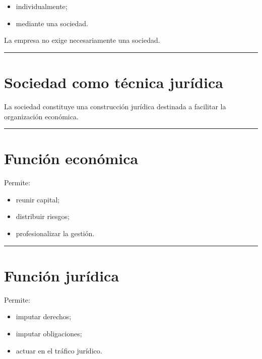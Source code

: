 \documentclass[
  spanish,
  letterpaper,
  DIV=11,
  numbers=noendperiod]{scrartcl}
\providecommand{\tightlist}{%
  \setlength{\itemsep}{0pt}\setlength{\parskip}{0pt}}
\begin{document}
\begin{itemize}
\tightlist
\item
  individualmente;
\item
  mediante una sociedad.
\end{itemize}

La empresa no exige necesariamente una sociedad.

\begin{center}\rule{0.5\linewidth}{0.5pt}\end{center}

\section{Sociedad como técnica
jurídica}\label{sociedad-como-tuxe9cnica-juruxeddica}

La sociedad constituye una construcción jurídica destinada a facilitar
la organización económica.

\begin{center}\rule{0.5\linewidth}{0.5pt}\end{center}

\section{Función económica}\label{funciuxf3n-econuxf3mica-1}

Permite:

\begin{itemize}
\tightlist
\item
  reunir capital;
\item
  distribuir riesgos;
\item
  profesionalizar la gestión.
\end{itemize}

\begin{center}\rule{0.5\linewidth}{0.5pt}\end{center}

\section{Función jurídica}\label{funciuxf3n-juruxeddica-1}

Permite:

\begin{itemize}
\tightlist
\item
  imputar derechos;
\item
  imputar obligaciones;
\item
  actuar en el tráfico jurídico.
\end{itemize}
\end{document}
